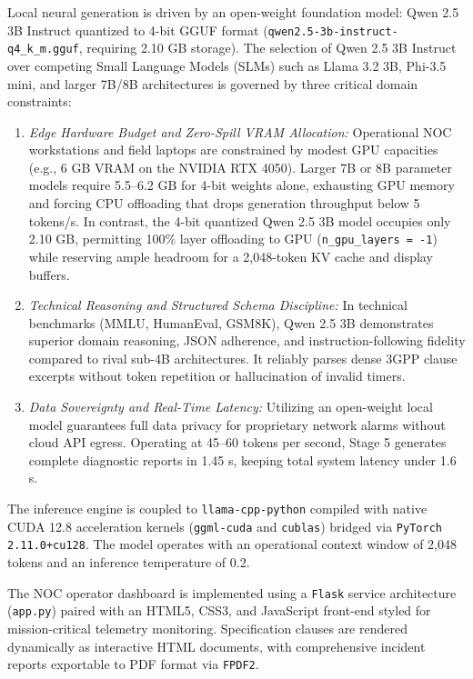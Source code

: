 \documentclass[conference]{IEEEtran}
\begin{document}
Local neural generation is driven by an open-weight foundation model: Qwen 2.5 3B Instruct quantized to 4-bit GGUF format (\texttt{qwen2.5-3b-instruct-q4\_k\_m.gguf}, requiring 2.10 GB storage). The selection of Qwen 2.5 3B Instruct over competing Small Language Models (SLMs) such as Llama 3.2 3B, Phi-3.5 mini, and larger 7B/8B architectures is governed by three critical domain constraints:
\begin{enumerate}
    \item \textit{Edge Hardware Budget and Zero-Spill VRAM Allocation:} Operational NOC workstations and field laptops are constrained by modest GPU capacities (e.g., 6 GB VRAM on the NVIDIA RTX 4050). Larger 7B or 8B parameter models require 5.5--6.2 GB for 4-bit weights alone, exhausting GPU memory and forcing CPU offloading that drops generation throughput below 5 tokens/s. In contrast, the 4-bit quantized Qwen 2.5 3B model occupies only 2.10 GB, permitting 100\% layer offloading to GPU (\texttt{n\_gpu\_layers = -1}) while reserving ample headroom for a 2,048-token KV cache and display buffers.
    \item \textit{Technical Reasoning and Structured Schema Discipline:} In technical benchmarks (MMLU, HumanEval, GSM8K), Qwen 2.5 3B demonstrates superior domain reasoning, JSON adherence, and instruction-following fidelity compared to rival sub-4B architectures. It reliably parses dense 3GPP clause excerpts without token repetition or hallucination of invalid timers.
    \item \textit{Data Sovereignty and Real-Time Latency:} Utilizing an open-weight local model guarantees full data privacy for proprietary network alarms without cloud API egress. Operating at 45--60 tokens per second, Stage 5 generates complete diagnostic reports in 1.45 s, keeping total system latency under 1.6 s.
\end{enumerate}
The inference engine is coupled to \texttt{llama-cpp-python} compiled with native CUDA 12.8 acceleration kernels (\texttt{ggml-cuda} and \texttt{cublas}) bridged via \texttt{PyTorch 2.11.0+cu128}. The model operates with an operational context window of 2,048 tokens and an inference temperature of 0.2.

The NOC operator dashboard is implemented using a \texttt{Flask} service architecture (\texttt{app.py}) paired with an HTML5, CSS3, and JavaScript front-end styled for mission-critical telemetry monitoring. Specification clauses are rendered dynamically as interactive HTML documents, with comprehensive incident reports exportable to PDF format via \texttt{FPDF2}.
\end{document}
